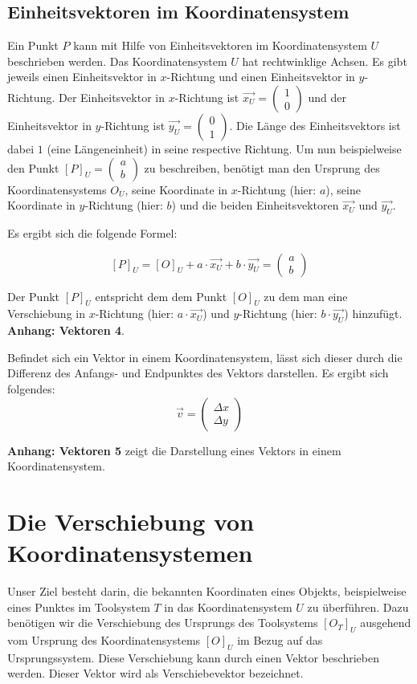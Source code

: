 \documentclass{article}
\newcommand{\m}[1]{\begin{pmatrix}#1\end{pmatrix}}
\begin{document}
    \subsection{Einheitsvektoren im Koordinatensystem}
    Ein Punkt $P$ kann mit Hilfe von Einheitsvektoren im Koordinatensystem $U$ beschrieben werden.
    Das Koordinatensystem $U$ hat rechtwinklige Achsen.
    Es gibt jeweils einen Einheitsvektor in
    $x$-Richtung und einen Einheitsvektor in $y$-Richtung. Der Einheitsvektor in $x$-Richtung ist $\vec{{x}_{U}} = \m{1 \\ 0}$ und der Einheitsvektor in
    $y$-Richtung ist $\vec{{y}_{U}} = \m{0 \\ 1}$. Die Länge des Einheitsvektors ist dabei $1$
    (eine Längeneinheit)
    in seine respective Richtung. Um nun beispielweise den Punkt
    ${[P]}_{U} = \m{a \\ b}$ zu beschreiben, benötigt man den Ursprung des Koordinatensystems ${O}_{U}$, seine Koordinate in $x$-Richtung (hier: $a$),
    seine Koordinate in $y$-Richtung (hier: $b$) und die beiden Einheitsvektoren $\vec{{x}_{U}}$ und $\vec{{y}_{U}}$.
    
    Es ergibt sich die folgende Formel:

    \[
        {[P]}_{U} = {[O]}_{U} + a \cdot \vec{{x}_{U}} + b \cdot \vec{{y}_{U}} = \m{a \\ b}
    \]

    Der Punkt ${[P]}_{U}$ entspricht dem dem Punkt ${[O]}_{U}$ zu dem man eine Verschiebung in
    $x$-Richtung (hier: $a \cdot \vec{{x}_{U}}$) und $y$-Richtung (hier: $b \cdot \vec{{y}_{U}}$) hinzufügt.
    \textbf{Anhang: Vektoren 4}.

    Befindet sich ein Vektor in einem Koordinatensystem, lässt sich dieser durch die Differenz
    des Anfangs- und Endpunktes des Vektors darstellen.
    Es ergibt sich folgendes: 
    \[
        \vec{v} = \m{\Delta{x} \\ \Delta{y}}
    \]

    \textbf{Anhang: Vektoren 5} zeigt die Darstellung eines Vektors in einem Koordinatensystem.
    

    \section{Die Verschiebung von Koordinatensystemen}
    
    Unser Ziel besteht darin, die bekannten Koordinaten eines Objekts, beispielweise eines Punktes
    im Toolsystem $T$ in das Koordinatensystem $U$ zu überführen.
    Dazu benötigen wir die Verschiebung des Ursprungs des Toolsystems ${[{O}_{T}]}_{U}$ ausgehend vom 
    Ursprung des Koordinatensystems ${[O]}_{U}$ im Bezug auf das Ursprungssystem.
    Diese Verschiebung kann durch einen Vektor beschrieben werden.
    Dieser Vektor wird als Verschiebevektor bezeichnet.
\end{document}
